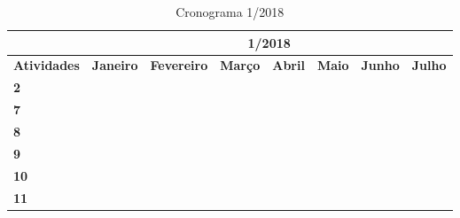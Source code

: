 \begin{table}[H]
\centering
\caption{Cronograma 1/2018}
\label{my-label}
\begin{tabular}{|l|l|l|l|l|l|l|l|}
\hline
                    & \multicolumn{7}{c|}{\textbf{1/2018}}                                                                                                                                                                                                                        \\ \hline
\textbf{Atividades} & \textbf{Janeiro}         & \textbf{Fevereiro}                              & \textbf{Março}           & \textbf{Abril}                                  & \textbf{Maio}                                   & \textbf{Junho} & \textbf{Julho}                                 \\ \hline
\textbf{2} & \cellcolor[HTML]{000000} & \cellcolor[HTML]{000000} & \cellcolor[HTML]{000000} & \cellcolor[HTML]{000000} & &  &\\
 \hline
\textbf{7}          & \cellcolor[HTML]{000000} & \cellcolor[HTML]{000000}{\color[HTML]{000000} } & \cellcolor[HTML]{000000} &                                 \cellcolor[HTML]{000000}                &                                                 &                              &                   \\ \hline
\textbf{8}         &                          &                                                 &  & \cellcolor[HTML]{000000}{\color[HTML]{000000} } &                                                \cellcolor[HTML]{000000} &   &                                              \\ \hline
\textbf{9}         &                          &                                                 &                          &                         &                      \cellcolor[HTML]{000000} &                          &                                                 \\ \hline
\textbf{10}         &                          &                                                 &                          &                                                 &                         &       \cellcolor[HTML]{000000} &                                          \\ \hline
\textbf{11}         &                          &                                                 &                          &                                &                 & \cellcolor[HTML]{000000}{\color[HTML]{000000} } & \cellcolor[HTML]{000000}{\color[HTML]{000000} } \\ \hline
\end{tabular}
\end{table}		